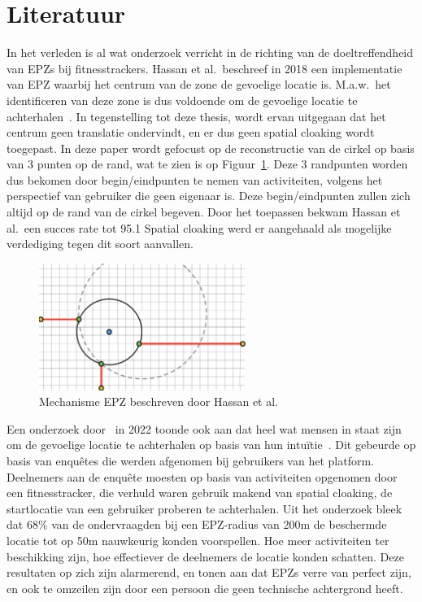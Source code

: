 \section{Literatuur}
In het verleden is al wat onderzoek verricht in de richting van de
doeltreffendheid van \acp{EPZ} bij fitnesstrackers. Hassan et al.\ beschreef in
2018 een implementatie van EPZ waarbij het centrum van de zone de gevoelige
locatie is. M.a.w.\ het identificeren van deze zone is dus voldoende om de
gevoelige locatie te achterhalen~\cite{sec18has3:online}. In tegenstelling tot
deze thesis, wordt ervan uitgegaan dat het centrum geen translatie ondervindt,
en er dus geen spatial cloaking wordt toegepast. In deze paper wordt gefocust
op de reconstructie van de cirkel op basis van 3 punten op de rand, wat te zien
is op Figuur~\ref{fig:Hassan_EPZ}. Deze 3 randpunten worden dus bekomen door
begin/eindpunten te nemen van activiteiten, volgens het perspectief van
gebruiker die geen eigenaar is. Deze begin/eindpunten zullen zich altijd op de
rand van de cirkel begeven. Door het toepassen bekwam Hassan et al.\ een succes
rate tot 95.1 Spatial cloaking werd er aangehaald als mogelijke verdediging
tegen dit soort aanvallen.
\begin{figure}[h]
    \centering
    \includegraphics[width=0.6\textwidth]{fig/EPZ-mechanisme/Hassan.png}
    \caption{Mechanisme \ac{EPZ} beschreven door Hassan et al.~\cite{sec18has3:online}}\label{fig:Hassan_EPZ}
\end{figure}

Een onderzoek door~\citeauthor{10.1145/3491102.3502136} in 2022 toonde ook aan
dat heel wat mensen in staat zijn om de gevoelige locatie te achterhalen op
basis van hun intuïtie~\cite{10.1145/3491102.3502136}. Dit gebeurde op basis
van enquêtes die werden afgenomen bij gebruikers van het platform. Deelnemers
aan de enquête moesten op basis van activiteiten opgenomen door een
fitnesstracker, die verhuld waren gebruik makend van spatial cloaking, de
startlocatie van een gebruiker proberen te achterhalen. Uit het onderzoek bleek
dat 68\% van de ondervraagden bij een \ac{EPZ}-radius van 200m de beschermde
locatie tot op 50m nauwkeurig konden voorspellen. Hoe meer activiteiten ter
beschikking zijn, hoe effectiever de deelnemers de locatie konden schatten.
Deze resultaten op zich zijn alarmerend, en tonen aan dat \acp{EPZ} verre van
perfect zijn, en ook te omzeilen zijn door een persoon die geen technische
achtergrond heeft.

